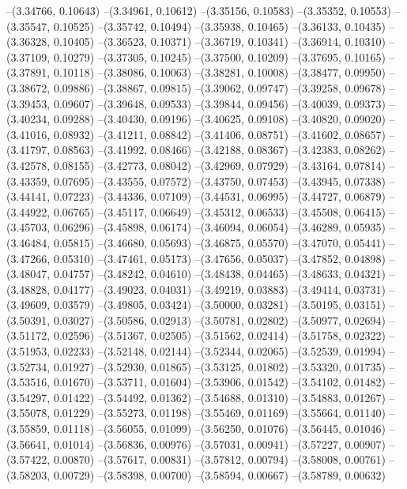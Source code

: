 --(3.34766, 0.10643)
--(3.34961, 0.10612)
--(3.35156, 0.10583)
--(3.35352, 0.10553)
--(3.35547, 0.10525)
--(3.35742, 0.10494)
--(3.35938, 0.10465)
--(3.36133, 0.10435)
--(3.36328, 0.10405)
--(3.36523, 0.10371)
--(3.36719, 0.10341)
--(3.36914, 0.10310)
--(3.37109, 0.10279)
--(3.37305, 0.10245)
--(3.37500, 0.10209)
--(3.37695, 0.10165)
--(3.37891, 0.10118)
--(3.38086, 0.10063)
--(3.38281, 0.10008)
--(3.38477, 0.09950)
--(3.38672, 0.09886)
--(3.38867, 0.09815)
--(3.39062, 0.09747)
--(3.39258, 0.09678)
--(3.39453, 0.09607)
--(3.39648, 0.09533)
--(3.39844, 0.09456)
--(3.40039, 0.09373)
--(3.40234, 0.09288)
--(3.40430, 0.09196)
--(3.40625, 0.09108)
--(3.40820, 0.09020)
--(3.41016, 0.08932)
--(3.41211, 0.08842)
--(3.41406, 0.08751)
--(3.41602, 0.08657)
--(3.41797, 0.08563)
--(3.41992, 0.08466)
--(3.42188, 0.08367)
--(3.42383, 0.08262)
--(3.42578, 0.08155)
--(3.42773, 0.08042)
--(3.42969, 0.07929)
--(3.43164, 0.07814)
--(3.43359, 0.07695)
--(3.43555, 0.07572)
--(3.43750, 0.07453)
--(3.43945, 0.07338)
--(3.44141, 0.07223)
--(3.44336, 0.07109)
--(3.44531, 0.06995)
--(3.44727, 0.06879)
--(3.44922, 0.06765)
--(3.45117, 0.06649)
--(3.45312, 0.06533)
--(3.45508, 0.06415)
--(3.45703, 0.06296)
--(3.45898, 0.06174)
--(3.46094, 0.06054)
--(3.46289, 0.05935)
--(3.46484, 0.05815)
--(3.46680, 0.05693)
--(3.46875, 0.05570)
--(3.47070, 0.05441)
--(3.47266, 0.05310)
--(3.47461, 0.05173)
--(3.47656, 0.05037)
--(3.47852, 0.04898)
--(3.48047, 0.04757)
--(3.48242, 0.04610)
--(3.48438, 0.04465)
--(3.48633, 0.04321)
--(3.48828, 0.04177)
--(3.49023, 0.04031)
--(3.49219, 0.03883)
--(3.49414, 0.03731)
--(3.49609, 0.03579)
--(3.49805, 0.03424)
--(3.50000, 0.03281)
--(3.50195, 0.03151)
--(3.50391, 0.03027)
--(3.50586, 0.02913)
--(3.50781, 0.02802)
--(3.50977, 0.02694)
--(3.51172, 0.02596)
--(3.51367, 0.02505)
--(3.51562, 0.02414)
--(3.51758, 0.02322)
--(3.51953, 0.02233)
--(3.52148, 0.02144)
--(3.52344, 0.02065)
--(3.52539, 0.01994)
--(3.52734, 0.01927)
--(3.52930, 0.01865)
--(3.53125, 0.01802)
--(3.53320, 0.01735)
--(3.53516, 0.01670)
--(3.53711, 0.01604)
--(3.53906, 0.01542)
--(3.54102, 0.01482)
--(3.54297, 0.01422)
--(3.54492, 0.01362)
--(3.54688, 0.01310)
--(3.54883, 0.01267)
--(3.55078, 0.01229)
--(3.55273, 0.01198)
--(3.55469, 0.01169)
--(3.55664, 0.01140)
--(3.55859, 0.01118)
--(3.56055, 0.01099)
--(3.56250, 0.01076)
--(3.56445, 0.01046)
--(3.56641, 0.01014)
--(3.56836, 0.00976)
--(3.57031, 0.00941)
--(3.57227, 0.00907)
--(3.57422, 0.00870)
--(3.57617, 0.00831)
--(3.57812, 0.00794)
--(3.58008, 0.00761)
--(3.58203, 0.00729)
--(3.58398, 0.00700)
--(3.58594, 0.00667)
--(3.58789, 0.00632)
